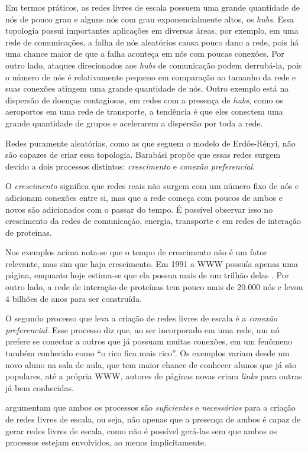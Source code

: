 \documentclass[12pt,a4paper,final]{article}
\begin{document}
Em termos práticos, as redes livres de escala possuem uma grande quantidade de nós de pouco grau e alguns nós com grau exponencialmente altos, os \textit{hubs}. Essa topologia possui importantes aplicações em diversas áreas, por exemplo, em uma rede de comunicações, a falha de nós aleatórios causa pouco dano a rede, pois há uma chance maior de que a falha aconteça em nós com poucas conexões. Por outro lado, ataques direcionados aos \textit{hubs} de comunicação podem derrubá-la, pois o número de nós é relativamente pequeno em comparação ao tamanho da rede e suas conexões atingem uma grande quantidade de nós. Outro exemplo está na dispersão de doenças contagiosas, em redes com a presença de \textit{hubs}, como os aeroportos em uma rede de transporte, a tendência é que eles conectem uma grande quantidade de grupos e acelerarem a dispersão por toda a rede.

Redes puramente aleatórias, como as que seguem o modelo de Erdős-Rényi, não são capazes de criar essa topologia. Barabási propõe que essas redes surgem devido a dois processos distintos: \textit{crescimento} e \textit{conexão preferencial}.

O \textit{crescimento} significa que redes reais não surgem com um número fixo de nós e adicionam conexões entre si, mas que a rede começa com poucos de ambos e novos são adicionados com o passar do tempo. É possível observar isso no crescimento da redes de comunicação, energia, transporte e em redes de interação de proteínas.

Nos exemplos acima nota-se que o tempo de crescimento não é um fator relevante, mas sim que haja crescimento. Em 1991 a WWW possuía apenas uma página, enquanto hoje estima-se que ela possua mais de um trilhão delas \cite{Barabasi2016-rn}. Por outro lado, a rede de interação de proteínas tem pouco mais de 20.000 nós e levou 4 bilhões de anos para ser construída.

O segundo processo que leva a criação de redes livres de escala é a \textit{conexão preferencial}. Esse processo diz que, ao ser incorporado em uma rede, um nó prefere se conectar a outros que já possuam muitas conexões, em um fenômeno também conhecido como \enquote{o rico fica mais rico}. Os exemplos variam desde um novo aluno na sala de aula, que tem maior chance de conhecer alunos que já são populares, até a própria WWW, autores de páginas novas criam \textit{links} para outras já bem conhecidas.

 argumentam que ambos os processos são \textit{suficientes} e \textit{necessários} para a criação de redes livres de escala, ou seja, não apenas que a presença de ambos é capaz de gerar redes livres de escala, como não é possível gerá-las sem que ambos os processos estejam envolvidos, ao menos implicitamente.
\end{document}
